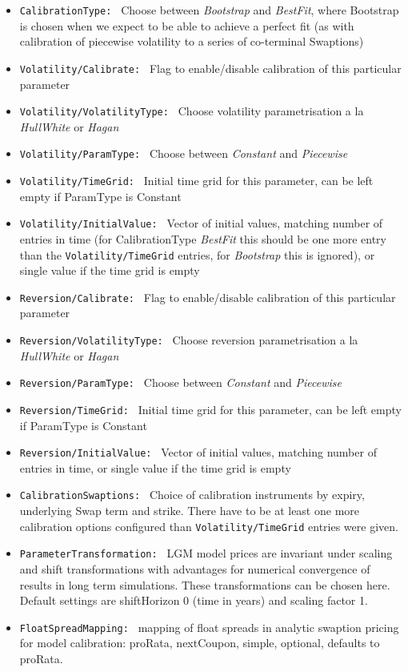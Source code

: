 \begin{itemize}
\item {\tt CalibrationType: } Choose between {\em Bootstrap} and {\em BestFit}, where Bootstrap is chosen when we expect
to be able to achieve a perfect fit (as with calibration of piecewise volatility to a series of co-terminal Swaptions)
\item {\tt Volatility/Calibrate: } Flag to enable/disable calibration of this particular parameter
\item {\tt Volatility/VolatilityType: } Choose volatility parametrisation a la {\em HullWhite} or {\em Hagan}
\item {\tt Volatility/ParamType: } Choose between {\em Constant} and {\em Piecewise}
\item {\tt Volatility/TimeGrid: } Initial time grid for this parameter, can be left empty if ParamType is Constant
\item {\tt Volatility/InitialValue: } Vector of initial values, matching number of entries in time (for CalibrationType {\em BestFit} this should be one more entry than the {\tt Volatility/TimeGrid} entries, for {\em Bootstrap} this is ignored), or single value if the time grid is empty
\item {\tt Reversion/Calibrate: } Flag to enable/disable calibration of this particular parameter
\item {\tt Reversion/VolatilityType: } Choose reversion parametrisation a la {\em HullWhite} or {\em Hagan}
\item {\tt Reversion/ParamType: } Choose between {\em Constant} and {\em Piecewise}
\item {\tt Reversion/TimeGrid: } Initial time grid for this parameter, can be left empty if ParamType is Constant
\item {\tt Reversion/InitialValue: } Vector of initial values, matching number of entries in time, or single value if
the time grid is empty
\item {\tt CalibrationSwaptions: } Choice of calibration instruments by expiry, underlying Swap term and strike. There have to be at least one more calibration options configured than {\tt Volatility/TimeGrid} entries were given.
\item {\tt ParameterTransformation: } LGM model prices are invariant under scaling and shift transformations
\cite{Lichters} with advantages for numerical convergence of results in long term simulations. These transformations can
be chosen here. Default settings are shiftHorizon 0 (time in years) and scaling factor 1.
\item {\tt FloatSpreadMapping: } mapping of float spreads in analytic swaption pricing for model calibration: proRata,
  nextCoupon, simple, optional, defaults to proRata.
\end{itemize}

